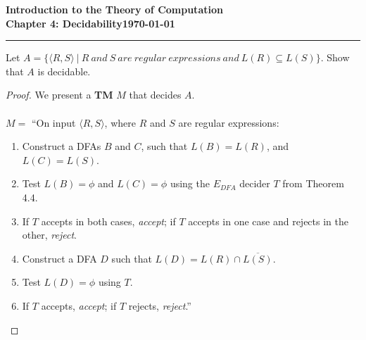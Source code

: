 \documentclass[11pt]{article}
\newcommand{\dated}{\today}
\begin{document}
\textbf{Introduction to the Theory of
Computation}\hfill\textbf{\myname}\\[0.01in]
\textbf{Chapter 4: Decidability}\hfill\textbf{\dated}\\
\smallskip\hrule\bigskip

\begin{problem}{4.13}
Let $A = \{\langle R, S \rangle \ | \ R \ and \ S \ are \ regular \ expressions \ and \ L(R) \subseteq L(S)\}$. Show that $A$ is decidable.
\end{problem}

\begin{proof}
We present a \textbf{TM} $M$ that decides $A$.  \\
\\
$M =$ \textquotedblleft On input $\langle R, S \rangle$, where $R$ and $S$ are regular expressions:
\begin{enumerate}
\item Construct a DFAs $B$ and $C$, such that $L(B) = L(R)$, and $L(C) = L(S)$.
\item Test $L(B) = \phi$ and $L(C) = \phi$ using the $E_{DFA}$ decider $T$ from Theorem 4.4.
\item If $T$ accepts in both cases, \textit{accept}; if $T$ accepts in one case and rejects in the other, \textit{reject}.
\item Construct a DFA $D$ such that $L(D) = L(R) \cap \overline{L(S)}.$
\item Test $L(D) = \phi$ using $T$.
\item If $T$ accepts, \textit{accept}; if $T$ rejects, \textit{reject}.\textquotedblright
\end{enumerate}
\end{proof}
\end{document}
